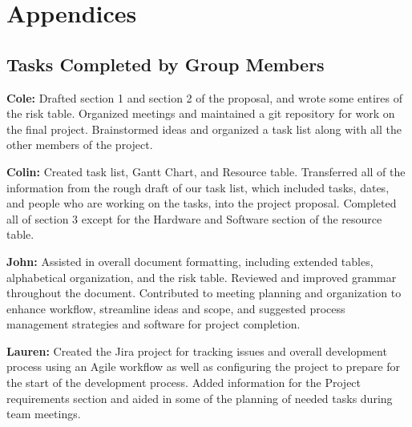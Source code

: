 \documentclass[english,12pt]{article}
\begin{document}
\section{Appendices}  

\subsection{Tasks Completed by Group Members}

\textbf{Cole:}
Drafted section 1 and section 2 of the proposal, and wrote some entires of the risk table.
Organized meetings and maintained a git repository for work on the final project. 
Brainstormed ideas and organized a task list along with all the other members
of the project.

\textbf{Colin:} 
Created task list, Gantt Chart, and Resource table. 
Transferred all of the information from the rough draft of our task list, which included tasks, 
dates, and people who are working on the tasks, into the project proposal. 
Completed all of section 3 except for the Hardware and Software section of the resource table.

\textbf{John:} 
Assisted in overall document formatting, 
including extended tables, alphabetical organization, 
and the risk table. Reviewed and improved grammar 
throughout the document. Contributed to meeting planning and organization to 
enhance workflow, streamline ideas and scope, and suggested process management 
strategies and software for project completion.

\textbf{Lauren:} 
Created the Jira project for tracking issues and overall development 
process using an Agile workflow as well as configuring the project to prepare for 
the start of the development process. Added information for the Project requirements 
section and aided in some of the planning of needed tasks during team meetings.
\end{document}

